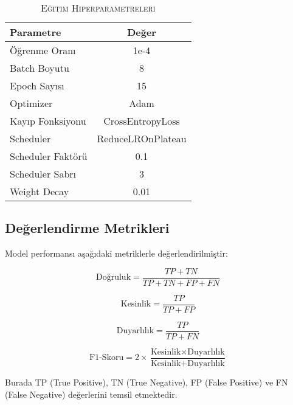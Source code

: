 \documentclass[conference, a4paper]{IEEEtran}
\begin{document}
	\begin{table}[h]
		\centering
		\caption{\textsc{Eğitim Hiperparametreleri}}
		\label{tablo_params}
		\begin{tabular}{|l|c|}
			\hline
			\textbf{Parametre} & \textbf{Değer} \\
			\hline
			Öğrenme Oranı & 1e-4 \\
			\hline
			Batch Boyutu & 8 \\
			\hline
			Epoch Sayısı & 15 \\
			\hline
			Optimizer & Adam \\
			\hline
			Kayıp Fonksiyonu & CrossEntropyLoss \\
			\hline
			Scheduler & ReduceLROnPlateau \\
			\hline
			Scheduler Faktörü & 0.1 \\
			\hline
			Scheduler Sabrı & 3 \\
			\hline
			Weight Decay & 0.01 \\
			\hline
		\end{tabular}
	\end{table}
	
	\subsection{Değerlendirme Metrikleri}
	
	Model performansı aşağıdaki metriklerle değerlendirilmiştir:
	
	\begin{equation}
		\text{Doğruluk} = \frac{TP + TN}{TP + TN + FP + FN}
		\label{eq_accuracy}
	\end{equation}
	
	\begin{equation}
		\text{Kesinlik} = \frac{TP}{TP + FP}
		\label{eq_precision}
	\end{equation}
	
	\begin{equation}
		\text{Duyarlılık} = \frac{TP}{TP + FN}
		\label{eq_recall}
	\end{equation}
	
	\begin{equation}
		\text{F1-Skoru} = 2 \times \frac{\text{Kesinlik} \times \text{Duyarlılık}}{\text{Kesinlik} + \text{Duyarlılık}}
		\label{eq_f1}
	\end{equation}
	
	Burada TP (True Positive), TN (True Negative), FP (False Positive) ve FN (False Negative) değerlerini temsil etmektedir.
	
\end{document}
